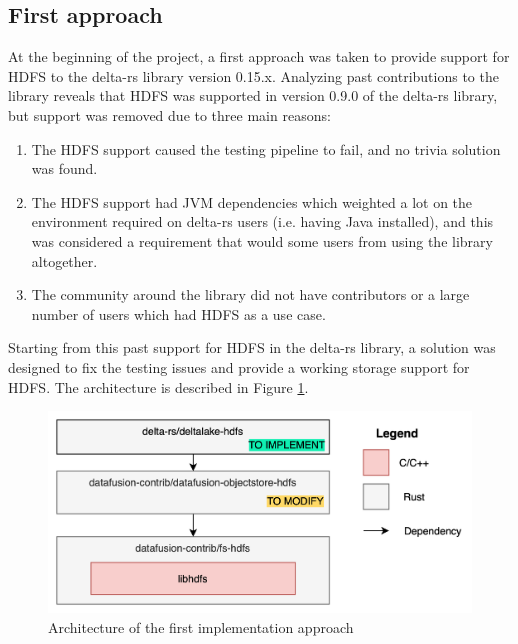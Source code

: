 \subsection{First approach}
At the beginning of the project, a first approach was taken to provide support for \gls{HDFS} to the delta-rs library version 0.15.x. Analyzing past contributions to the library reveals that \gls{HDFS} was supported in version 0.9.0 of the delta-rs library, but support was removed due to three main reasons:
\begin{enumerate}
  \item The \gls{HDFS} support caused the testing pipeline to fail, and no trivia solution was found.
  \item The \gls{HDFS} support had \gls{JVM} dependencies which weighted a lot on the environment required on delta-rs users (i.e. having Java installed), and this was considered a requirement that would some users from using the library altogether.
  \item The community around the library did not have contributors or a large number of users which had \gls{HDFS} as a use case.
\end{enumerate}
Starting from this past support for \gls{HDFS} in the delta-rs library, a solution was designed to fix the testing issues and provide a working storage support for \gls{HDFS}. The architecture is described in Figure \ref{fig:approach_1_solution_schema}. 

\begin{figure}[!ht]
  \begin{center}
    \includegraphics[width=\textwidth]{figures/4-implementation/approach1_solution_schema.png}
  \caption{Architecture of the first implementation approach}
  \label{fig:approach_1_solution_schema}
  \end{center}
\end{figure}


